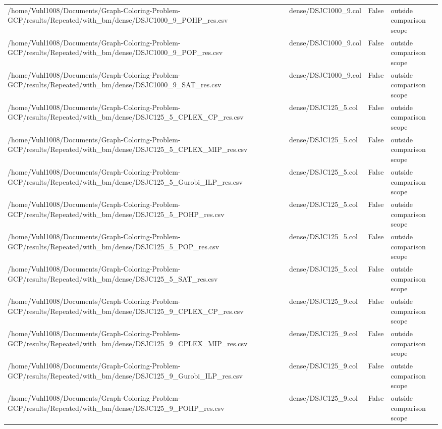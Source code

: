 \begin{table}[htbp]
\begin{tabular}{llll}
/home/Vuhl1008/Documents/Graph-Coloring-Problem-GCP/results/Repeated/with\_bm/dense/DSJC1000\_9\_POHP\_res.csv & dense/DSJC1000\_9.col & False & outside comparison scope \\
/home/Vuhl1008/Documents/Graph-Coloring-Problem-GCP/results/Repeated/with\_bm/dense/DSJC1000\_9\_POP\_res.csv & dense/DSJC1000\_9.col & False & outside comparison scope \\
/home/Vuhl1008/Documents/Graph-Coloring-Problem-GCP/results/Repeated/with\_bm/dense/DSJC1000\_9\_SAT\_res.csv & dense/DSJC1000\_9.col & False & outside comparison scope \\
/home/Vuhl1008/Documents/Graph-Coloring-Problem-GCP/results/Repeated/with\_bm/dense/DSJC125\_5\_CPLEX\_CP\_res.csv & dense/DSJC125\_5.col & False & outside comparison scope \\
/home/Vuhl1008/Documents/Graph-Coloring-Problem-GCP/results/Repeated/with\_bm/dense/DSJC125\_5\_CPLEX\_MIP\_res.csv & dense/DSJC125\_5.col & False & outside comparison scope \\
/home/Vuhl1008/Documents/Graph-Coloring-Problem-GCP/results/Repeated/with\_bm/dense/DSJC125\_5\_Gurobi\_ILP\_res.csv & dense/DSJC125\_5.col & False & outside comparison scope \\
/home/Vuhl1008/Documents/Graph-Coloring-Problem-GCP/results/Repeated/with\_bm/dense/DSJC125\_5\_POHP\_res.csv & dense/DSJC125\_5.col & False & outside comparison scope \\
/home/Vuhl1008/Documents/Graph-Coloring-Problem-GCP/results/Repeated/with\_bm/dense/DSJC125\_5\_POP\_res.csv & dense/DSJC125\_5.col & False & outside comparison scope \\
/home/Vuhl1008/Documents/Graph-Coloring-Problem-GCP/results/Repeated/with\_bm/dense/DSJC125\_5\_SAT\_res.csv & dense/DSJC125\_5.col & False & outside comparison scope \\
/home/Vuhl1008/Documents/Graph-Coloring-Problem-GCP/results/Repeated/with\_bm/dense/DSJC125\_9\_CPLEX\_CP\_res.csv & dense/DSJC125\_9.col & False & outside comparison scope \\
/home/Vuhl1008/Documents/Graph-Coloring-Problem-GCP/results/Repeated/with\_bm/dense/DSJC125\_9\_CPLEX\_MIP\_res.csv & dense/DSJC125\_9.col & False & outside comparison scope \\
/home/Vuhl1008/Documents/Graph-Coloring-Problem-GCP/results/Repeated/with\_bm/dense/DSJC125\_9\_Gurobi\_ILP\_res.csv & dense/DSJC125\_9.col & False & outside comparison scope \\
/home/Vuhl1008/Documents/Graph-Coloring-Problem-GCP/results/Repeated/with\_bm/dense/DSJC125\_9\_POHP\_res.csv & dense/DSJC125\_9.col & False & outside comparison scope \\

\end{tabular}
\end{table}
